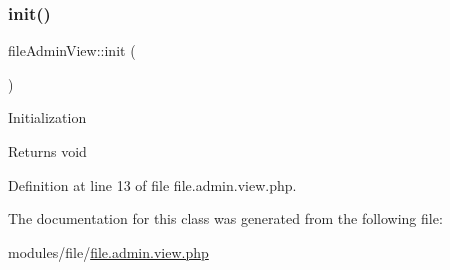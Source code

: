 \mbox{\label{classfileAdminView_a0467616ea8da4c869f29f1660505e04d}} 
\subsubsection{\texorpdfstring{init()}{init()}}
{\footnotesize\ttfamily file\+Admin\+View\+::init (\begin{DoxyParamCaption}{ }\end{DoxyParamCaption})}

Initialization \begin{DoxyReturn}{Returns}
void 
\end{DoxyReturn}


Definition at line 13 of file file.\+admin.\+view.\+php.



The documentation for this class was generated from the following file\+:\begin{DoxyCompactItemize}
\item 
modules/file/\hyperlink{file_8admin_8view_8php}{file.\+admin.\+view.\+php}\end{DoxyCompactItemize}
